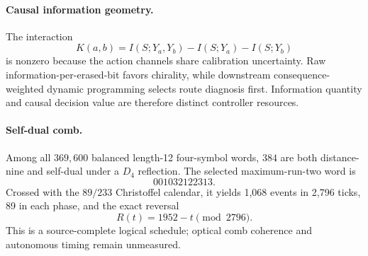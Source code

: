 \paragraph{Causal information geometry.}
The interaction
\[
 K(a,b)=I(S;Y_a,Y_b)-I(S;Y_a)-I(S;Y_b)
\]
is nonzero because the action channels share calibration uncertainty.  Raw
information-per-erased-bit favors chirality, while downstream consequence-weighted
dynamic programming selects route diagnosis first.  Information quantity and causal
decision value are therefore distinct controller resources.

\paragraph{Self-dual comb.}
Among all \(369,600\) balanced length-12 four-symbol words, \(384\) are both
distance-nine and self-dual under a \(D_4\) reflection.  The selected maximum-run-two
word is
\[
  001032122313.
\]
Crossed with the \(89/233\) Christoffel calendar, it yields 1,068 events in 2,796 ticks,
89 in each phase, and the exact reversal
\[
  R(t)=1952-t\pmod{2796}.
\]
This is a source-complete logical schedule; optical comb coherence and autonomous
timing remain unmeasured.
